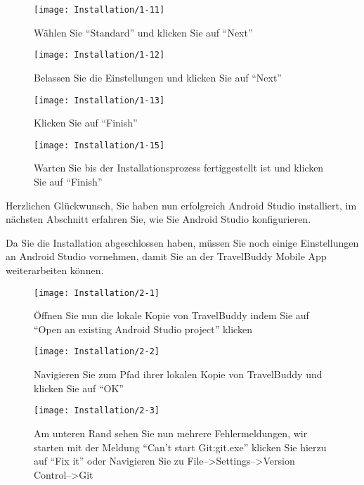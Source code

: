 \begin{figure}
  \centering
  \texttt{[image: Installation/1-11]}
  \caption{Wählen Sie ``Standard'' und klicken Sie auf ``Next''}
\end{figure}

\begin{figure}
  \centering
  \texttt{[image: Installation/1-12]}
  \caption{Belassen Sie die Einstellungen und klicken Sie auf ``Next''}
\end{figure}

\begin{figure}
  \centering
  \texttt{[image: Installation/1-13]}
  \caption{Klicken Sie auf ``Finish''}
\end{figure}

\begin{figure}
  \centering
  \texttt{[image: Installation/1-15]}
  \caption{Warten Sie bis der Installationsprozess fertiggestellt ist und klicken Sie auf ``Finish''}
\end{figure}

Herzlichen Glückwunsch, Sie haben nun erfolgreich Android Studio installiert, im nächsten Abschnitt erfahren Sie, wie Sie Android Studio konfigurieren.


Da Sie die Installation abgeschlossen haben, müssen Sie noch einige Einstellungen an Android Studio vornehmen, damit Sie an der TravelBuddy Mobile App weiterarbeiten können.

\begin{figure}
  \centering
  \texttt{[image: Installation/2-1]}
  \caption{Öffnen Sie nun die lokale Kopie von TravelBuddy indem Sie auf ``Open an existing Android Studio project'' klicken}
\end{figure}

\begin{figure}
  \centering
  \texttt{[image: Installation/2-2]}
  \caption{Navigieren Sie zum Pfad ihrer lokalen Kopie von TravelBuddy und klicken Sie auf ``OK''}
\end{figure}

\begin{figure}
  \centering
  \texttt{[image: Installation/2-3]}
  \caption{Am unteren Rand sehen Sie nun mehrere Fehlermeldungen, wir starten mit der Meldung ``Can't start Git:git.exe'' klicken Sie hierzu auf ``Fix it'' oder Navigieren Sie zu File-->Settings-->Version Control-->Git}
\end{figure}

